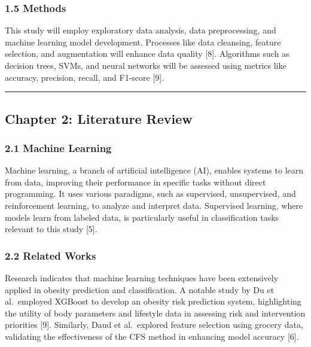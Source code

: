 \hypertarget{methods}{%
\subsubsection{1.5 Methods}\label{methods}}

This study will employ exploratory data analysis, data preprocessing,
and machine learning model development. Processes like data cleansing,
feature selection, and augmentation will enhance data quality {[}8{]}.
Algorithms such as decision trees, SVMs, and neural networks will be
assessed using metrics like accuracy, precision, recall, and F1-score
{[}9{]}.

\begin{center}\rule{0.5\linewidth}{0.5pt}\end{center}

\hypertarget{chapter-2-literature-review}{%
\subsection{Chapter 2: Literature
Review}\label{chapter-2-literature-review}}

\hypertarget{machine-learning}{%
\subsubsection{2.1 Machine Learning}\label{machine-learning}}

Machine learning, a branch of artificial intelligence (AI), enables
systems to learn from data, improving their performance in specific
tasks without direct programming. It uses various paradigms, such as
supervised, unsupervised, and reinforcement learning, to analyze and
interpret data. Supervised learning, where models learn from labeled
data, is particularly useful in classification tasks relevant to this
study {[}5{]}.

\hypertarget{related-works}{%
\subsubsection{2.2 Related Works}\label{related-works}}

Research indicates that machine learning techniques have been
extensively applied in obesity prediction and classification. A notable
study by Du et al.~employed XGBoost to develop an obesity risk
prediction system, highlighting the utility of body parameters and
lifestyle data in assessing risk and intervention priorities {[}9{]}.
Similarly, Daud et al.~explored feature selection using grocery data,
validating the effectiveness of the CFS method in enhancing model
accuracy {[}6{]}.

